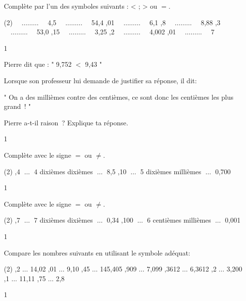 \documentclass[a4paper,11pt]{report}
\begin{document}
\vfill

\begin{exop}
{Complète par l'un des symboles suivants : < ; > ou $=$.
\begin{tasks}[after-item-skip = 0.4em, after-skip=-0.5em](2)
 $\quad\ldots\ldots\ldots\quad$ 4,5
 $\quad\ldots\ldots\ldots\quad$ 54,4
,01 $\quad\ldots\ldots\ldots\quad$ 6,1
,8 $\quad\ldots\ldots\ldots\quad$ 8,88
,3 $\quad\ldots\ldots\ldots\quad$ 53,0
,15 $\quad\ldots\ldots\ldots\quad$ 3,25
,2 $\quad\ldots\ldots\ldots\quad$ 4,002
,01 $\quad\ldots\ldots\ldots\quad$ 7
\end{tasks}
}{1}\end{exop}


\vfill

\newpage 

\begin{exo}
{Pierre dit que : " 9,752 $<$ 9,43 "

Lorsque son professeur lui demande de justifier sa réponse, il dit: 
 
 " On a des millièmes contre des centièmes, ce sont donc les centièmes les plus grand~! "
 
 Pierre a-t-il raison~? Explique ta réponse.
}{1}
\end{exo}



\begin{exop}{
Complète avec le signe $=$ ou $\not =$.
\begin{tasks}[after-item-skip = 0.5em, after-skip=-0.5em](2)
,4 $\; \ldots\;$ 4 dixièmes 
 dixièmes $\; \ldots\;$ 8,5
,10 $\; \ldots\;$ 5 dixièmes
 millièmes $\; \ldots\;$ 0,700
\end{tasks}
}{1}\end{exop}

\begin{exop}{
Complète avec le signe $=$ ou $\not =$.
\begin{tasks}[after-item-skip = 0.5em, after-skip=-0.5em](2)
,7 $\; \ldots\;$ 7 dixièmes 
 dixièmes $\; \ldots\;$ 0,34
,100 $\; \ldots\;$ 6 centièmes
 millièmes $\; \ldots\;$ 0,001
\end{tasks}


}{1}\end{exop}


\begin{exop}{
Compare les nombres suivants  en utilisant le symbole adéquat:
\begin{tasks}[after-item-skip = 0.5em, after-skip=-0.5em](2)
,2 $\ldots$ 14,02
,01 $\ldots$ 9,10 
,45 $\ldots$ 145,405
,909 $\ldots$ 7,099
,3612 $\ldots$ 6,3612
,2 $\ldots$ 3,200
,1 $\ldots$ 11,11
,75 $\ldots$ 2,8
\end{tasks}

}{1}\end{exop}
\end{document}
